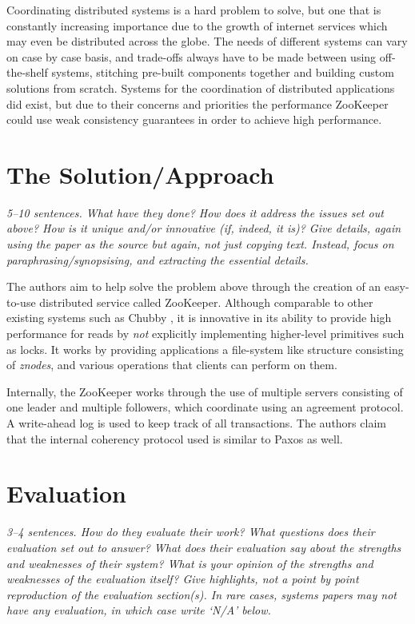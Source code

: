 \documentclass[11pt]{article}
\begin{document}
Coordinating distributed systems is a hard problem to solve, but one that is
constantly increasing importance due to the growth of internet services which
may even be distributed across the globe. The needs of different systems can
vary on case by case basis, and trade-offs always have to be made between using
off-the-shelf systems, stitching pre-built components together and building
custom solutions from scratch. Systems for the coordination of distributed
applications did exist, but due to their concerns and priorities the
performance ZooKeeper could use weak consistency guarantees in order to achieve
high performance.

\section*{The Solution/Approach}

\textsl{5--10 sentences. What have they done? How does it address the issues
set out above? How is it unique and/or innovative (if, indeed, it is)? Give
details, again using the paper as the source but again, not just copying text.
Instead, focus on paraphrasing/synopsising, and extracting the essential
details.}

The authors aim to help solve the problem above through the creation of an
easy-to-use distributed service called ZooKeeper. Although comparable to other
existing systems such as Chubby \cite{Chubby}, it is innovative in its ability
to provide high performance for reads by \textit{not} explicitly implementing
higher-level primitives such as locks. It works by providing applications a
file-system like structure consisting of \textit{znodes}, and various
operations that clients can perform on them.

Internally, the ZooKeeper works through the use of multiple servers consisting
of one leader and multiple followers, which coordinate using an agreement
protocol. A write-ahead log is used to keep track of all transactions. The
authors claim that the internal coherency protocol used is similar to Paxos as
well.


\section*{Evaluation}

\textsl{3--4 sentences. How do they evaluate their work? What questions does
their evaluation set out to answer? What does their evaluation say about the
strengths and weaknesses of their system? What is your opinion of the strengths
and weaknesses of the evaluation itself? Give highlights, not a point by point
reproduction of the evaluation section(s). In rare cases, systems papers may
not have any evaluation, in which case write `N/A' below.}
\end{document}
